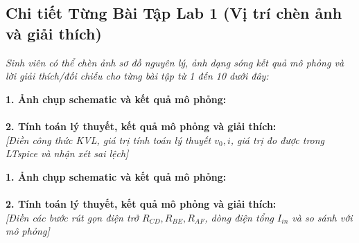 \documentclass[12pt,a4paper]{report}
\begin{document}
\begin{orangebox}
\centering
\vspace{0.3cm}
\vspace{0.3cm}
\end{orangebox}

\subsection*{Chi tiết Từng Bài Tập Lab 1 (Vị trí chèn ảnh và giải thích)}
\textit{\color{guidegray}Sinh viên có thể chèn ảnh sơ đồ nguyên lý, ảnh dạng sóng kết quả mô phỏng và lời giải thích/đối chiếu cho từng bài tập từ 1 đến 10 dưới đây:}

\begin{orangebox}
\textbf{1. Ảnh chụp schematic và kết quả mô phỏng:}\\
\\[0.2cm]
\textbf{2. Tính toán lý thuyết, kết quả mô phỏng và giải thích:}\\
\textit{\color{guidegray}[Điền công thức KVL, giá trị tính toán lý thuyết $v_0, i$, giá trị đo được trong LTspice và nhận xét sai lệch]}
\end{orangebox}

\begin{orangebox}
\textbf{1. Ảnh chụp schematic và kết quả mô phỏng:}\\
\\[0.2cm]
\textbf{2. Tính toán lý thuyết, kết quả mô phỏng và giải thích:}\\
\textit{\color{guidegray}[Điền các bước rút gọn điện trở $R_{CD}, R_{BE}, R_{AF}$, dòng điện tổng $I_{in}$ và so sánh với mô phỏng]}
\end{orangebox}
\end{document}
